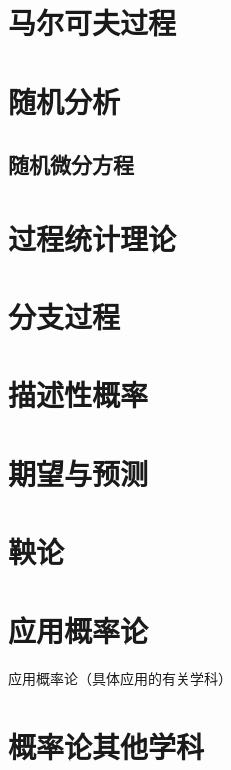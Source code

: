\documentclass[UTF8]{../09-Mathematics}
\begin{document}
\chapter{马尔可夫过程}
\chapter{随机分析}
\section{随机微分方程}


\chapter{过程统计理论}
\chapter{分支过程}
\chapter{描述性概率}
\chapter{期望与预测}

\chapter{鞅论}

\chapter{应用概率论}
应用概率论（具体应用的有关学科）
\chapter{概率论其他学科}
\end{document}
